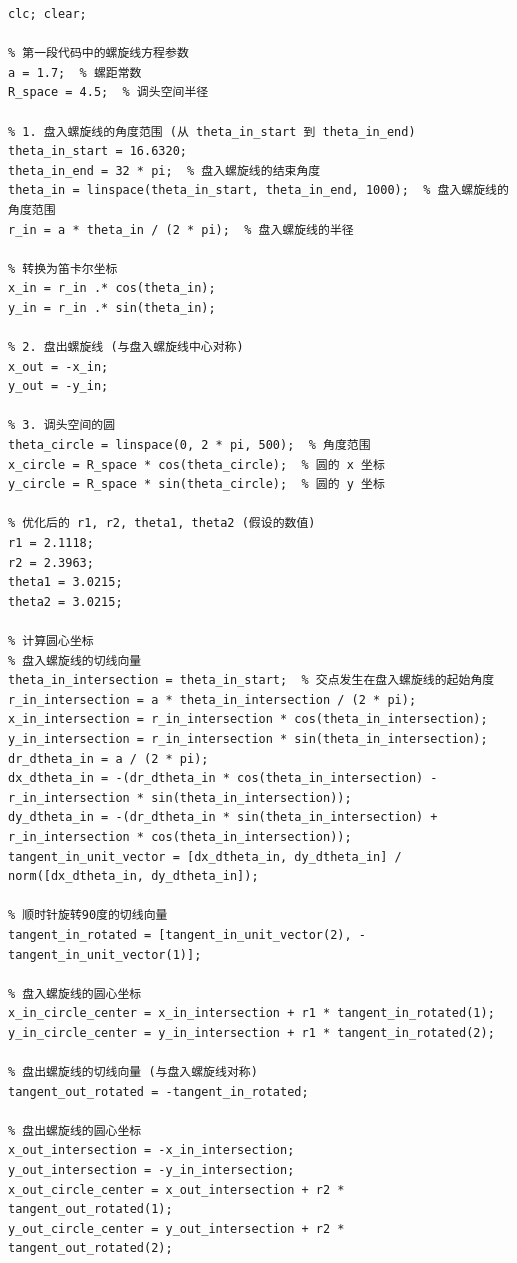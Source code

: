\documentclass{cumcmthesis1}
\begin{document}
\begin{lstlisting}[caption={对问题4整个调头过程进行仿真模拟的代码}, label={lst:ninth_code}]
clc; clear;

% 第一段代码中的螺旋线方程参数
a = 1.7;  % 螺距常数
R_space = 4.5;  % 调头空间半径

% 1. 盘入螺旋线的角度范围 (从 theta_in_start 到 theta_in_end)
theta_in_start = 16.6320;
theta_in_end = 32 * pi;  % 盘入螺旋线的结束角度
theta_in = linspace(theta_in_start, theta_in_end, 1000);  % 盘入螺旋线的角度范围
r_in = a * theta_in / (2 * pi);  % 盘入螺旋线的半径

% 转换为笛卡尔坐标
x_in = r_in .* cos(theta_in);
y_in = r_in .* sin(theta_in);

% 2. 盘出螺旋线 (与盘入螺旋线中心对称)
x_out = -x_in;
y_out = -y_in;

% 3. 调头空间的圆
theta_circle = linspace(0, 2 * pi, 500);  % 角度范围
x_circle = R_space * cos(theta_circle);  % 圆的 x 坐标
y_circle = R_space * sin(theta_circle);  % 圆的 y 坐标

% 优化后的 r1, r2, theta1, theta2 (假设的数值)
r1 = 2.1118;
r2 = 2.3963;
theta1 = 3.0215;
theta2 = 3.0215;

% 计算圆心坐标
% 盘入螺旋线的切线向量
theta_in_intersection = theta_in_start;  % 交点发生在盘入螺旋线的起始角度
r_in_intersection = a * theta_in_intersection / (2 * pi);
x_in_intersection = r_in_intersection * cos(theta_in_intersection);
y_in_intersection = r_in_intersection * sin(theta_in_intersection);
dr_dtheta_in = a / (2 * pi);
dx_dtheta_in = -(dr_dtheta_in * cos(theta_in_intersection) - r_in_intersection * sin(theta_in_intersection));
dy_dtheta_in = -(dr_dtheta_in * sin(theta_in_intersection) + r_in_intersection * cos(theta_in_intersection));
tangent_in_unit_vector = [dx_dtheta_in, dy_dtheta_in] / norm([dx_dtheta_in, dy_dtheta_in]);

% 顺时针旋转90度的切线向量
tangent_in_rotated = [tangent_in_unit_vector(2), -tangent_in_unit_vector(1)];

% 盘入螺旋线的圆心坐标
x_in_circle_center = x_in_intersection + r1 * tangent_in_rotated(1);
y_in_circle_center = y_in_intersection + r1 * tangent_in_rotated(2);

% 盘出螺旋线的切线向量 (与盘入螺旋线对称)
tangent_out_rotated = -tangent_in_rotated;

% 盘出螺旋线的圆心坐标
x_out_intersection = -x_in_intersection;
y_out_intersection = -y_in_intersection;
x_out_circle_center = x_out_intersection + r2 * tangent_out_rotated(1);
y_out_circle_center = y_out_intersection + r2 * tangent_out_rotated(2);


\end{lstlisting}
\end{document}
